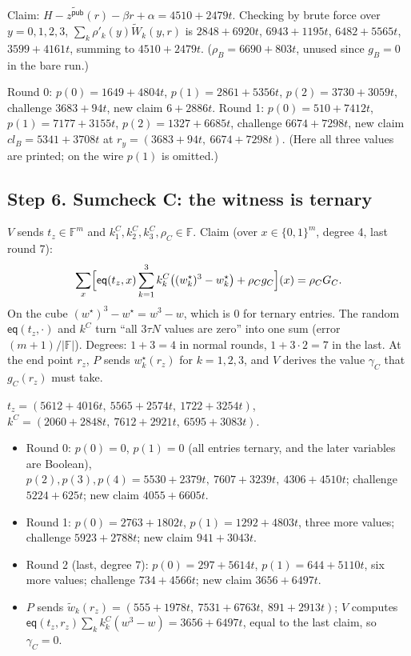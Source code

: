 \documentclass[11pt,a4paper]{article}
\newcommand{\F}{\mathbb{F}}
\newcommand{\cube}[1]{\{0,1\}^{#1}}
\newcommand{\eq}{\mathsf{eq}}
\newcommand{\mle}[1]{\widetilde{#1}}
\newcommand{\msk}[1]{#1^{\star}}
\newcommand{\zpub}{z^{\mathsf{pub}}}
\theoremstyle{definition}
\theoremstyle{plain}
\begin{document}
\begin{toyrun}[Sumcheck B ($\log N=2$ rounds)]
Claim: $H-\mle\zpub(r)-\beta r+\alpha=4510{+}2479t$. Checking by brute force over $y=0,1,2,3$,
$\sum_k\rho'_k(y)\mle W_k(y,r)$ is $2848{+}6920t$, $6943{+}1195t$, $6482{+}5565t$, $3599{+}4161t$, summing to
$4510{+}2479t$. \checkmark{} ($\rho_B=6690{+}803t$, unused since $g_B=0$ in the bare run.)

Round 0: $p(0)=1649{+}4804t$, $p(1)=2861{+}5356t$, $p(2)=3730{+}3059t$, challenge $3683{+}94t$, new claim
$6{+}2886t$. Round 1: $p(0)=510{+}7412t$, $p(1)=7177{+}3155t$, $p(2)=1327{+}6685t$, challenge
$6674{+}7298t$, new claim $\mathit{cl}_B=5341{+}3708t$ at $r_y=(3683{+}94t,\ 6674{+}7298t)$.
(Here all three values are printed; on the wire $p(1)$ is omitted.)
\end{toyrun}

\subsection*{Step 6. Sumcheck C: the witness is ternary}

$V$ sends $t_z\in\F^m$ and $k^C_1,k^C_2,k^C_3,\rho_C\in\F$. Claim (over $x\in\cube m$, degree 4, last round 7):
\[
  \sum_x\Bigl[\eq(t_z,x)\sum_{k=1}^3k^C_k\bigl((\msk w_k)^3-\msk w_k\bigr)+\rho_Cg_C\Bigr](x)=\rho_CG_C .
\]
On the cube $(\msk w)^3-\msk w=w^3-w$, which is $0$ for ternary entries. The random $\eq(t_z,\cdot)$ and $k^C$
turn ``all $3\tau N$ values are zero'' into one sum (error $(m+1)/|\F|$). Degrees: $1+3=4$ in normal rounds,
$1+3\cdot 2=7$ in the last. At the end point $r_z$, $P$ sends $\msk w_k(r_z)$ for $k=1,2,3$, and $V$ derives
the value $\gamma_C$ that $g_C(r_z)$ must take.

\begin{toyrun}[Sumcheck C ($m=3$ rounds)]
$t_z=(5612{+}4016t,\ 5565{+}2574t,\ 1722{+}3254t)$, $k^C=(2060{+}2848t,\ 7612{+}2921t,\ 6595{+}3083t)$.
\begin{itemize}[leftmargin=1.2em]
\item Round 0: $p(0)=0$, $p(1)=0$ (all entries ternary, and the later variables are Boolean), $p(2),p(3),p(4)=
  5530{+}2379t,\ 7607{+}3239t,\ 4306{+}4510t$; challenge $5224{+}625t$; new claim $4055{+}6605t$.
\item Round 1: $p(0)=2763{+}1802t$, $p(1)=1292{+}4803t$, three more values; challenge $5923{+}2788t$;
  new claim $941{+}3043t$.
\item Round 2 (last, degree 7): $p(0)=297{+}5614t$, $p(1)=644{+}5110t$, six more values;
  challenge $734{+}4566t$; new claim $3656{+}6497t$.
\item $P$ sends $\mle w_k(r_z)=(555{+}1978t,\ 7531{+}6763t,\ 891{+}2913t)$; $V$ computes
  $\eq(t_z,r_z)\sum_kk^C_k(w^3-w)=3656{+}6497t$, equal to the last claim, so $\gamma_C=0$.
\end{itemize}
\end{toyrun}
\end{document}
